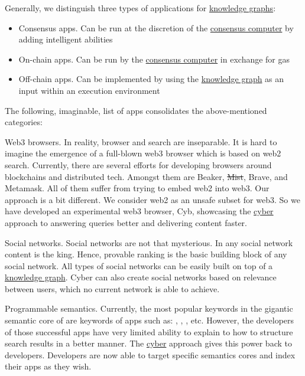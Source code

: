 \documentclass[8pt,oneside]{amsart}
\newcommand{\linkred}[2]{\href{#1}{\color{red}{#2}}}
\begin{document}
Generally, we distinguish three types of applications for {\hyperref[knowledge-graph]{knowledge graphs}}:

\begin{itemize}
\item Consensus apps. Can be run at the discretion of the {\hyperref[consensus-computer]{consensus computer}} by adding intelligent abilities
\item On-chain apps. Can be run by the {\hyperref[consensus-computer]{consensus computer}} in exchange for gas
\item Off-chain apps. Can be implemented by using the {\hyperref[knowledge-graph]{knowledge graph}} as an input within an execution environment
\end{itemize}

The following, imaginable, list of apps consolidates the above-mentioned categories:

Web3 browsers. In reality, browser and search are inseparable. It is hard to imagine the emergence of a full-blown web3 browser which is based on web2 search. Currently, there are several efforts for developing browsers around blockchains and distributed tech. Amongst them are Beaker, \sout{Mist}, Brave, and Metamask. All of them suffer from trying to embed web2 into web3. Our approach is a bit different. We consider web2 as an unsafe subset for web3. So we have developed an experimental web3 browser, Cyb, showcasing the {\hyperref[cyber]{cyber}} approach to answering queries better and delivering content faster.

Social networks. Social networks are not that mysterious. In any social network content is the king. Hence, provable ranking is the basic building block of any social network. All types of social networks can be easily built on top of a {\hyperref[knowledge-graph]{knowledge graph}}. Cyber can also create social networks based on relevance between users, which no current network is able to achieve.

Programmable semantics. Currently, the most popular keywords in the gigantic semantic core of \linkred{https://google.com}{Google} are keywords of apps such as: \linkred{https://youtube.com}{Youtube}, \linkred{https://facebook.com}{Facebook}, \linkred{https://github.com}{GitHub}, etc. However, the developers of those successful apps have very limited ability to explain to \linkred{https://google.com}{Google} how to structure search results in a better manner. The {\hyperref[cyber]{cyber}} approach gives this power back to developers. Developers are now able to target specific semantics cores and index their apps as they wish.
\end{document}
